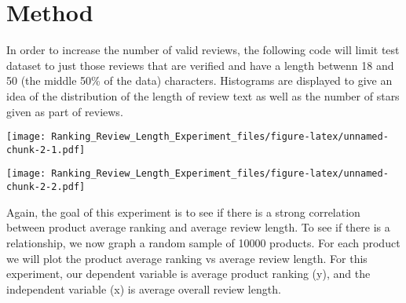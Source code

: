 \documentclass[
]{article}
\newenvironment{Shaded}{\begin{snugshade}}{\end{snugshade}}
\newcommand{\DecValTok}[1]{\textcolor[rgb]{0.00,0.00,0.81}{#1}}
\newcommand{\FunctionTok}[1]{\textcolor[rgb]{0.00,0.00,0.00}{#1}}
\newcommand{\NormalTok}[1]{#1}
\newcommand{\OtherTok}[1]{\textcolor[rgb]{0.56,0.35,0.01}{#1}}
\newcommand{\SpecialCharTok}[1]{\textcolor[rgb]{0.00,0.00,0.00}{#1}}
\begin{document}
\hypertarget{method}{%
\section{Method}\label{method}}

In order to increase the number of valid reviews, the following code
will limit test dataset to just those reviews that are verified and have
a length betwenn 18 and 50 (the middle 50\% of the data) characters.
Histograms are displayed to give an idea of the distribution of the
length of review text as well as the number of stars given as part of
reviews.

\begin{Shaded}
\end{Shaded}

\texttt{[image: Ranking\_Review\_Length\_Experiment\_files/figure-latex/unnamed-chunk-2-1.pdf]}

\begin{Shaded}
\end{Shaded}

\texttt{[image: Ranking\_Review\_Length\_Experiment\_files/figure-latex/unnamed-chunk-2-2.pdf]}

Again, the goal of this experiment is to see if there is a strong
correlation between product average ranking and average review length.
To see if there is a relationship, we now graph a random sample of 10000
products. For each product we will plot the product average ranking vs
average review length. For this experiment, our dependent variable is
average product ranking (y), and the independent variable (x) is average
overall review length.
\end{document}
